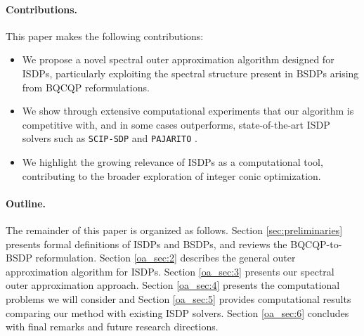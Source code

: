 \documentclass{article}
\begin{document}
\paragraph{Contributions.}
This paper makes the following contributions:

\begin{itemize}
    \item We propose a novel spectral outer approximation algorithm designed for ISDPs, particularly exploiting the spectral structure present in BSDPs arising from BQCQP reformulations.
    \item We show through extensive computational experiments that our algorithm is competitive with, and in some cases outperforms, state-of-the-art ISDP solvers such as \texttt{SCIP-SDP} \cite{gally2018framework} and \texttt{PAJARITO} \cite{lubin2018polyhedral}.
    \item We highlight the growing relevance of ISDPs as a computational tool, contributing to the broader exploration of integer conic optimization.
\end{itemize}

\paragraph{Outline.}  
The remainder of this paper is organized as follows. Section \ref{sec:preliminaries} presents formal definitions of ISDPs and BSDPs, and reviews the BQCQP-to-BSDP reformulation. Section \ref{oa_sec:2} describes the general outer approximation algorithm for ISDPs. Section \ref{oa_sec:3} presents our spectral outer approximation approach. Section \ref{oa_sec:4} presents the computational problems we will  consider and Section \ref{oa_sec:5} provides computational results comparing our method with existing ISDP solvers. Section \ref{oa_sec:6} concludes with final remarks and future research directions.
\end{document}
